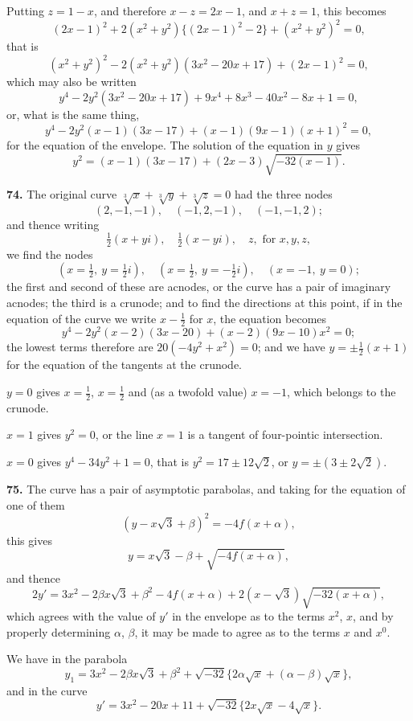 \documentclass[11pt,a4paper]{article}
\theoremstyle{plain}
\begin{document}
Putting $z = 1-x$, and therefore $x-z = 2x-1$, and $x+z = 1$, this becomes
\[
(2x-1)^2 + 2(x^2+y^2)\{(2x-1)^2 - 2\} + (x^2+y^2)^2 = 0,
\]
that is
\[
(x^2+y^2)^2 - 2(x^2+y^2)(3x^2 - 20x + 17) + (2x-1)^2 = 0,
\]
which may also be written
\[
y^4 - 2y^2(3x^2 - 20x + 17) + 9x^4 + 8x^3 - 40x^2 - 8x + 1 = 0,
\]
or, what is the same thing,
\[
y^4 - 2y^2(x-1)(3x-17) + (x-1)(9x-1)(x+1)^2 = 0,
\]
for the equation of the envelope. The solution of the equation in $y$ gives
\[
y^2 = (x-1)(3x-17) + (2x-3)\sqrt{-32(x-1)}.
\]

\noindent\textbf{74.} The original curve $\sqrt[3]{x} + \sqrt[3]{y} + \sqrt[3]{z} = 0$ had the three nodes
\[
(2, -1, -1), \quad (-1, 2, -1), \quad (-1, -1, 2);
\]
and thence writing
\[
\tfrac{1}{2}(x+yi), \quad \tfrac{1}{2}(x-yi), \quad z, \text{ for } x, y, z,
\]
we find the nodes
\[
(x = \tfrac{1}{2},\ y = \tfrac{1}{2}i), \quad (x = \tfrac{1}{2},\ y = -\tfrac{1}{2}i), \quad (x = -1,\ y = 0);
\]
the first and second of these are acnodes, or the curve has a pair of imaginary acnodes; the third is a crunode; and to find the directions at this point, if in the equation of the curve we write $x - \tfrac{1}{2}$ for $x$, the equation becomes
\[
y^4 - 2y^2(x-2)(3x-20) + (x-2)(9x-10)x^2 = 0;
\]
the lowest terms therefore are $20(-4y^2 + x^2) = 0$; and we have $y = \pm\tfrac{1}{2}(x+1)$ for the equation of the tangents at the crunode.

$y = 0$ gives $x = \tfrac{1}{2}$, $x = \tfrac{1}{2}$ and (as a twofold value) $x = -1$, which belongs to the crunode.

$x = 1$ gives $y^2 = 0$, or the line $x = 1$ is a tangent of four-pointic intersection.

$x = 0$ gives $y^4 - 34y^2 + 1 = 0$, that is $y^2 = 17 \pm 12\sqrt{2}$, or $y = \pm(3 \pm 2\sqrt{2})$.

\noindent\textbf{75.} The curve has a pair of asymptotic parabolas, and taking for the equation of one of them
\[
(y - x\sqrt{3} + \beta)^2 = -4f(x + \alpha),
\]
this gives
\[
y = x\sqrt{3} - \beta + \sqrt{-4f(x+\alpha)},
\]
and thence
\[
2y' = 3x^2 - 2\beta x\sqrt{3} + \beta^2 - 4f(x+\alpha) + 2(x-\sqrt{3})\sqrt{-32(x+\alpha)},
\]
which agrees with the value of $y'$ in the envelope as to the terms $x^2$, $x$, and by properly determining $\alpha$, $\beta$, it may be made to agree as to the terms $x$ and $x^0$.

We have in the parabola
\[
y_1 = 3x^2 - 2\beta x\sqrt{3} + \beta^2 + \sqrt{-32}\{2\alpha\sqrt{x} + (\alpha-\beta)\sqrt{x}\},
\]
and in the curve
\[
y' = 3x^2 - 20x + 11 + \sqrt{-32}\{2x\sqrt{x} - 4\sqrt{x}\}.
\]
\end{document}
